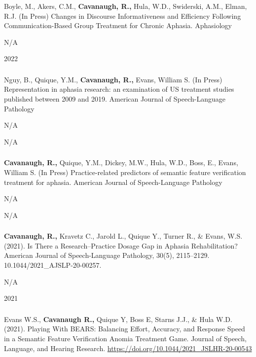 \documentclass[
]{article}
\begin{document}
Boyle, M., Akers, C.M., \textbf{Cavanaugh, R.,} Hula, W.D., Swiderski,
A.M., Elman, R.J. (In Press) Changes in Discourse Informativeness and
Efficiency Following Communication-Based Group Treatment for Chronic
Aphasia. Aphasiology

N/A

2022

\hypertarget{section-1}{%
\subsubsection{}\label{section-1}}

Nguy, B., Quique, Y.M., \textbf{Cavanaugh, R.,} Evans, William S. (In
Press) Representation in aphasia research: an examination of US
treatment studies published between 2009 and 2019. American Journal of
Speech-Language Pathology

N/A

N/A

\hypertarget{section-2}{%
\subsubsection{}\label{section-2}}

\textbf{Cavanaugh, R.,} Quique, Y.M., Dickey, M.W., Hula, W.D., Boss,
E., Evans, William S. (In Press) Practice-related predictors of semantic
feature verification treatment for aphasia. American Journal of
Speech-Language Pathology

N/A

N/A

\hypertarget{section-3}{%
\subsubsection{}\label{section-3}}

\textbf{Cavanaugh, R.,} Kravetz C., Jarold L., Quique Y., Turner R., \&
Evans, W.S. (2021). Is There a Research--Practice Dosage Gap in Aphasia
Rehabilitation? American Journal of Speech-Language Pathology, 30(5),
2115--2129. 10.1044/2021\_AJSLP-20-00257.

N/A

2021

\hypertarget{section-4}{%
\subsubsection{}\label{section-4}}

Evans W.S., \textbf{Cavanaugh R.,} Quique Y, Boss E, Starns J.J., \&
Hula W.D. (2021). Playing With BEARS: Balancing Effort, Accuracy, and
Response Speed in a Semantic Feature Verification Anomia Treatment Game.
Journal of Speech, Language, and Hearing Research.
\url{https://doi.org/10.1044/2021_JSLHR-20-00543}
\end{document}
